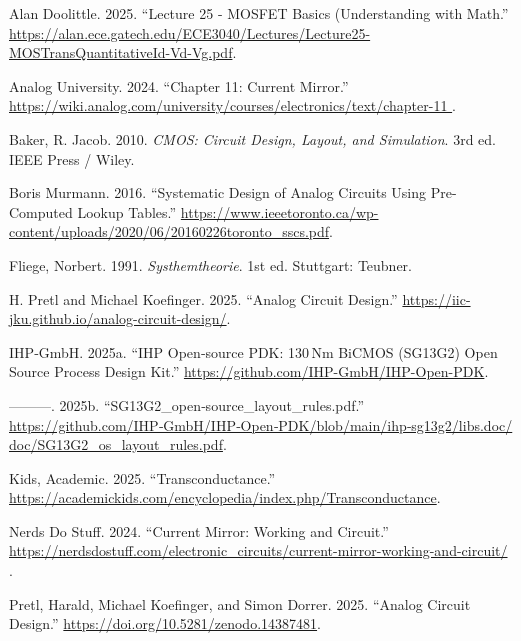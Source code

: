 \documentclass[
  letterpaper,
]{scrbook}
\newlength{\cslhangindent}
\newenvironment{CSLReferences}[2] %
 {\begin{list}{}{%
  \setlength{\itemindent}{0pt}
  \setlength{\leftmargin}{0pt}
  \setlength{\parsep}{0pt}
  \ifodd #1
   \setlength{\leftmargin}{\cslhangindent}
   \setlength{\itemindent}{-1\cslhangindent}
  \fi
  \setlength{\itemsep}{#2\baselineskip}}}
 {\end{list}}
\begin{document}

\label{refs}
\begin{CSLReferences}{1}{0}
Alan Doolittle. 2025. {``{Lecture 25 - MOSFET Basics (Understanding with
Math}.''}
\url{https://alan.ece.gatech.edu/ECE3040/Lectures/Lecture25-MOSTransQuantitativeId-Vd-Vg.pdf}.

Analog University. 2024. {``Chapter 11: Current Mirror.''}
\href{https://wiki.analog.com/university/courses/electronics/text/chapter-11\%20}{https://wiki.analog.com/university/courses/electronics/text/chapter-11
}.

Baker, R. Jacob. 2010. \emph{CMOS: Circuit Design, Layout, and
Simulation}. 3rd ed. IEEE Press / Wiley.

Boris Murmann. 2016. {``{Systematic Design of Analog Circuits Using
Pre-Computed Lookup Tables}.''}
\url{https://www.ieeetoronto.ca/wp-content/uploads/2020/06/20160226toronto_sscs.pdf}.

Fliege, Norbert. 1991. \emph{Systhemtheorie}. 1st ed. Stuttgart:
Teubner.

H. Pretl and Michael Koefinger. 2025. {``{Analog Circuit Design}.''}
\url{https://iic-jku.github.io/analog-circuit-design/}.

IHP‑GmbH. 2025a. {``IHP Open‑source PDK: 130\,Nm BiCMOS (SG13G2) Open
Source Process Design Kit.''}
\url{https://github.com/IHP-GmbH/IHP-Open-PDK}.

---------. 2025b. {``SG13G2\_open‑source\_layout\_rules.pdf.''}
\url{https://github.com/IHP‑GmbH/IHP‑Open‑PDK/blob/main/ihp‑sg13g2/libs.doc/doc/SG13G2_os_layout_rules.pdf}.

Kids, Academic. 2025. {``Transconductance.''}
\url{https://academickids.com/encyclopedia/index.php/Transconductance}.

Nerds Do Stuff. 2024. {``Current Mirror: Working and Circuit.''}
\href{https://nerdsdostuff.com/electronic_circuits/current-mirror-working-and-circuit/\%20}{https://nerdsdostuff.com/electronic\_circuits/current-mirror-working-and-circuit/
}.

Pretl, Harald, Michael Koefinger, and Simon Dorrer. 2025. {``Analog
{Circuit} {Design}.''} \url{https://doi.org/10.5281/zenodo.14387481}.


\end{CSLReferences}
\end{document}
